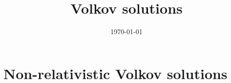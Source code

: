 \documentclass[10pt,oneside,a4paper,fleqn]{book}
\title{Volkov solutions}
\date{\today}
\numberwithin{chapter}{part}
\begin{document}
\maketitle

\part{Non-relativistic Volkov solutions}



\end{document}
